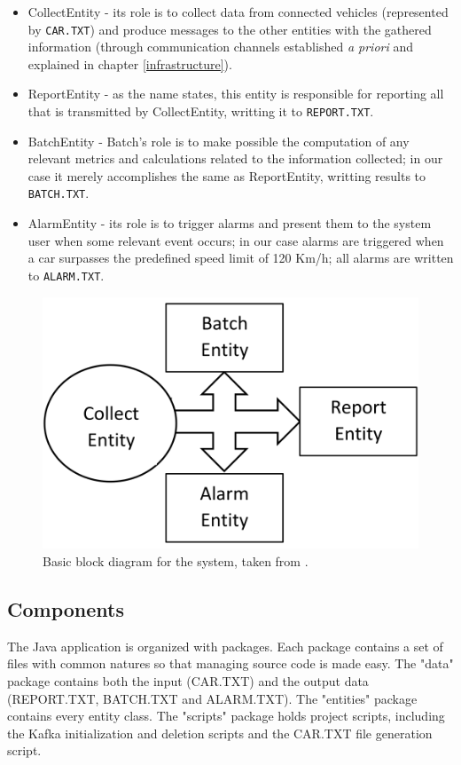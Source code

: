 \documentclass[12pt]{article}
\begin{document}
\vspace{-10pt}
\begin{itemize}[noitemsep]
  \item CollectEntity - its role is to collect data from connected vehicles (represented by \texttt{CAR.TXT}) and produce messages to the other entities with the gathered information (through communication channels established \textit{a priori} and explained in chapter \ref{infrastructure}).
  \item ReportEntity - as the name states, this entity is responsible for reporting all that is transmitted by CollectEntity, writting it to \texttt{REPORT.TXT}.
  \item BatchEntity - Batch's role is to make possible the computation of any relevant metrics and calculations related to the information collected; in our case it merely accomplishes the same as ReportEntity, writting results to \texttt{BATCH.TXT}.
  \item AlarmEntity - its role is to trigger alarms and present them to the system user when some relevant event occurs; in our case alarms are triggered when a car surpasses the predefined speed limit of 120 Km/h; all alarms are written to \texttt{ALARM.TXT}.
\end{itemize}
\vspace{-10pt}

\begin{figure}[H]
  \centering
  \begin{minipage}{\textwidth}
    \centering
    \includegraphics[width=.4\linewidth]{img/BlockDiagram.png}
  \end{minipage}%
  \caption{Basic block diagram for the system, taken from \cite{assign}.}
  \label{BlockDiagram}
\end{figure} 

\subsection{Components} %

The Java application is organized with packages.
Each package contains a set of files with common natures so that managing source code is made easy.
The "data" package contains both the input (CAR.TXT) and the output data (REPORT.TXT, BATCH.TXT and ALARM.TXT).
The "entities" package contains every entity class.
The "scripts" package holds project scripts, including the Kafka initialization and deletion scripts and the CAR.TXT file generation script.
\end{document}
